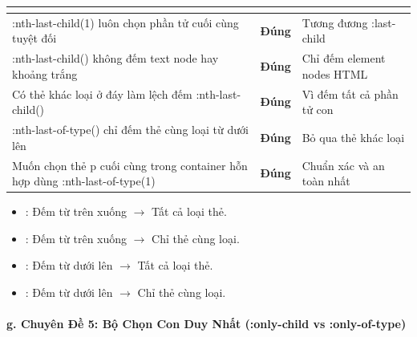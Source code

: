 \begin{prettyTableBox}
\sffamily\small
\begin{tabularx}{\linewidth}{|Z|>{\centering\arraybackslash\bfseries}m{2.0cm}|>{\raggedright\arraybackslash}m{4.5cm}|}
\hline
{}  &  &  \\
\hline
:nth-last-child(1) luôn chọn phần tử cuối cùng tuyệt đối & \textcolor{green!70!black}{Đúng} & Tương đương :last-child \\
\hline
:nth-last-child() không đếm text node hay khoảng trắng & \textcolor{green!70!black}{Đúng} & Chỉ đếm element nodes HTML \\
\hline
Có thẻ khác loại ở đáy làm lệch đếm :nth-last-child() & \textcolor{green!70!black}{Đúng} & Vì đếm tất cả phần tử con \\
\hline
:nth-last-of-type() chỉ đếm thẻ cùng loại từ dưới lên & \textcolor{green!70!black}{Đúng} & Bỏ qua thẻ khác loại \\
\hline
Muốn chọn thẻ p cuối cùng trong container hỗn hợp dùng :nth-last-of-type(1) & \textcolor{green!70!black}{Đúng} & Chuẩn xác và an toàn nhất \\
\hline
\end{tabularx}
\end{prettyTableBox}

\begin{tipBox}
\begin{itemize}[leftmargin=1.5em, itemsep=3pt, parsep=0pt]
    \item {}: Đếm từ trên xuống $\rightarrow$ Tất cả loại thẻ.
    \item {}: Đếm từ trên xuống $\rightarrow$ Chỉ thẻ cùng loại.
    \item {}: Đếm từ dưới lên $\rightarrow$ Tất cả loại thẻ.
    \item {}: Đếm từ dưới lên $\rightarrow$ Chỉ thẻ cùng loại.
\end{itemize}
\end{tipBox}

\paragraph{g. Chuyên Đề 5: Bộ Chọn Con Duy Nhất (:only-child vs :only-of-type)}

